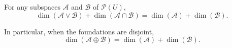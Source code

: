For any subspaces $\mathcal{A}$ and $\mathcal{B}$ of $\mathcal{P}(U)$,
$$\dim(\mathcal{A} \vee \mathcal{B}) + \dim(\mathcal{A} \cap \mathcal{B}) = \dim(\mathcal{A}) + \dim(\mathcal{B}).$$

In particular, when the foundations are disjoint,
$$\dim(\mathcal{A} \oplus \mathcal{B}) = \dim(\mathcal{A}) + \dim(\mathcal{B}).$$
